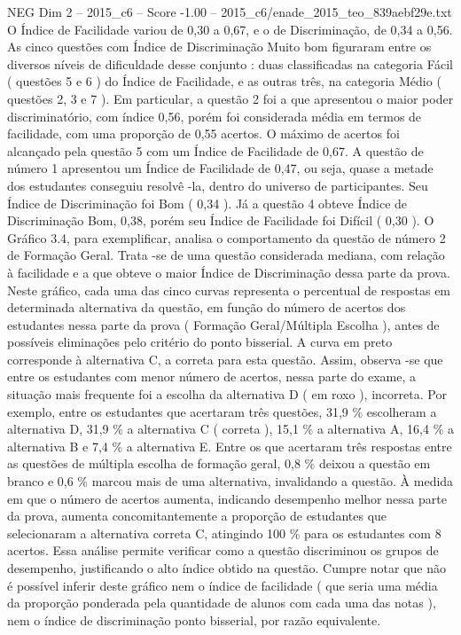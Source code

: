 \begin{textsample}{NEG Dim 2 – 2015\_c6 – Score -1.00 – 2015\_c6/enade\_2015\_teo\_839aebf29e.txt}
O Índice de Facilidade variou de 0,30 a 0,67, e o de Discriminação, de 0,34 a 0,56.
As cinco questões com Índice de Discriminação Muito bom figuraram entre os diversos níveis de dificuldade desse conjunto : duas classificadas na categoria Fácil ( questões 5 e 6 ) do Índice de Facilidade, e as outras três, na categoria Médio ( questões 2, 3 e 7 ).
Em particular, a questão 2 foi a que apresentou o maior poder discriminatório, com índice 0,56, porém foi considerada média em termos de facilidade, com uma proporção de 0,55 acertos.
O máximo de acertos foi alcançado pela questão 5 com um Índice de Facilidade de 0,67.
A questão de número 1 apresentou um Índice de Facilidade de 0,47, ou seja, quase a metade dos estudantes conseguiu resolvê -la, dentro do universo de participantes.
Seu Índice de Discriminação foi Bom ( 0,34 ).
Já a questão 4 obteve Índice de Discriminação Bom, 0,38, porém seu Índice de Facilidade foi Difícil ( 0,30 ).
O Gráfico 3.4, para exemplificar, analisa o comportamento da questão de número 2 de Formação Geral.
Trata -se de uma questão considerada mediana, com relação à facilidade e a que obteve o maior Índice de Discriminação dessa parte da prova.
Neste gráfico, cada uma das cinco curvas representa o percentual de respostas em determinada alternativa da questão, em função do número de acertos dos estudantes nessa parte da prova ( Formação Geral/Múltipla Escolha ), antes de possíveis eliminações pelo critério do ponto bisserial.
A curva em preto corresponde à alternativa C, a correta para esta questão.
Assim, observa -se que entre os estudantes com menor número de acertos, nessa parte do exame, a situação mais frequente foi a escolha da alternativa D ( em roxo ), incorreta.
Por exemplo, entre os estudantes que acertaram três questões, 31,9 \% escolheram a alternativa D, 31,9 \% a alternativa C ( correta ), 15,1 \% a alternativa A, 16,4 \% a alternativa B e 7,4 \% a alternativa E.
Entre os que acertaram três respostas entre as questões de múltipla escolha de formação geral, 0,8 \% deixou a questão em branco e 0,6 \% marcou mais de uma alternativa, invalidando a questão.
À medida em que o número de acertos aumenta, indicando desempenho melhor nessa parte da prova, aumenta concomitantemente a proporção de estudantes que selecionaram a alternativa correta C, atingindo 100 \% para os estudantes com 8 acertos.
Essa análise permite verificar como a questão discriminou os grupos de desempenho, justificando o alto índice obtido na questão.
Cumpre notar que não é possível inferir deste gráfico nem o índice de facilidade ( que seria uma média da proporção ponderada pela quantidade de alunos com cada uma das notas ), nem o índice de discriminação ponto bisserial, por razão equivalente.

\end{textsample}

